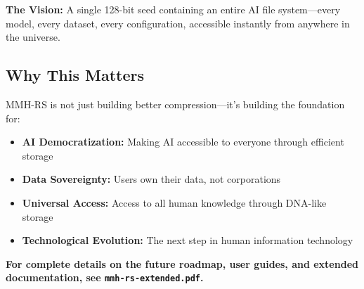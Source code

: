 \documentclass[11pt,a4paper]{article}
\begin{document}
	\textbf{The Vision:} A single 128-bit seed containing an entire AI file system—every model, every dataset, every configuration, accessible instantly from anywhere in the universe.
	
	\subsection{Why This Matters}
	
	MMH-RS is not just building better compression—it's building the foundation for:
	\begin{itemize}
		\item \textbf{AI Democratization:} Making AI accessible to everyone through efficient storage
		\item \textbf{Data Sovereignty:} Users own their data, not corporations
		\item \textbf{Universal Access:} Access to all human knowledge through DNA-like storage
		\item \textbf{Technological Evolution:} The next step in human information technology
	\end{itemize}
	
	\textbf{For complete details on the future roadmap, user guides, and extended documentation, see \texttt{mmh-rs-extended.pdf}.}
	
\end{document}
